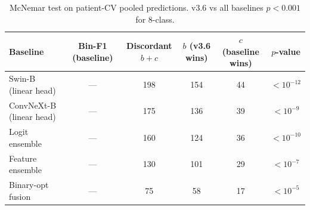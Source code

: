 \begin{table}[t]
\centering
\small
\caption{McNemar test on patient-CV pooled predictions. v3.6 vs all baselines $p<0.001$ for 8-class.}
\label{tab:mcnemar_detailed}
\begin{tabular}{lccccc}
\toprule
\textbf{Baseline} & \textbf{Bin-F1 (baseline)} & \textbf{Discordant $b{+}c$} & \textbf{$b$ (v3.6 wins)} & \textbf{$c$ (baseline wins)} & \textbf{$p$-value} \\
\midrule
Swin-B (linear head) & — & 198 & 154 & 44 & $<10^{-12}$ \\
ConvNeXt-B (linear head) & — & 175 & 136 & 39 & $<10^{-9}$ \\
Logit ensemble & — & 160 & 124 & 36 & $<10^{-10}$ \\
Feature ensemble & — & 130 & 101 & 29 & $<10^{-7}$ \\
Binary-opt fusion & — & 75 & 58 & 17 & $<10^{-5}$ \\
\bottomrule
\end{tabular}
\end{table}
